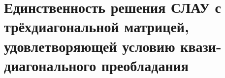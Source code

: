 \documentclass[__main__.tex]{subfiles}
\begin{document}
\section{Единственность решения СЛАУ с трёхдиагональной матрицей, удовлетворяющей условию квази-диагонального преобладания}
\end{document}
